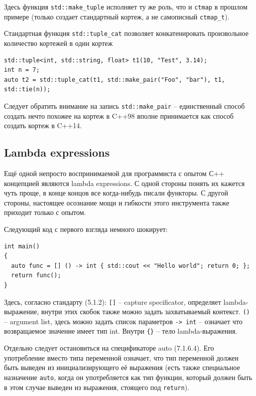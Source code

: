 \documentclass[a4paper,12pt,oneside]{article}
\begin{document}
Здесь функция \lstinline!std::make_tuple! исполняет ту же роль, что и \lstinline!ctmap! в прошлом примере (только создает стандартный кортеж, а не самописный \lstinline!ctmap_t!).

Стандартная функция \lstinline!std::tuple_cat! позволяет конкатенировать произвольное количество кортежей в один кортеж

\begin{lstlisting}
std::tuple<int, std::string, float> t1(10, "Test", 3.14);
int n = 7;
auto t2 = std::tuple_cat(t1, std::make_pair("Foo", "bar"), t1, std::tie(n));
\end{lstlisting}

Следует обратить внимание на запись \lstinline!std::make_pair! -- единственный способ создать нечто похожее на кортеж в C++98 вполне принимается как способ создать кортеж в C++14.

\pagebreak
\subsection{Lambda expressions}\label{LambdaExpressions}

Ещё одной непросто воспринимаемой для программиста с опытом С++ концепцией являются lambda expressions. С одной стороны понять их кажется чуть проще, в конце концов все когда-нибудь писали функторы. С другой стороны, настоящее осознание мощи и гибкости этого инструмента также приходит только с опытом. 

Следующий код с первого взгляда немного шокирует:

\begin{lstlisting}
int main()
{
  auto func = [] () -> int { std::cout << "Hello world"; return 0; };
  return func(); 
}
\end{lstlisting}

Здесь, согласно стандарту (5.1.2): 
\lstinline![]! -- capture specificator, определяет lambda-выражение, внутри этих скобок также можно задать захватываемый контекст.
\lstinline!()! -- argument list, здесь можно задать список параметров
\lstinline!-> int! -- означает что возвращаемое значение имеет тип int.
Внутри \lstinline!{}! -- тело lambda-выражения.

Отдельно следует остановиться на спецификаторе auto (7.1.6.4). Его употребление вместо типа переменной означает, что тип переменной должен быть выведен из инициализирующего её выражения (есть также специальное назначение \lstinline!auto!, когда он употребляется как тип функции, который должен быть в этом случае выведен из выражения, стоящего под \lstinline!return!).
\end{document}
